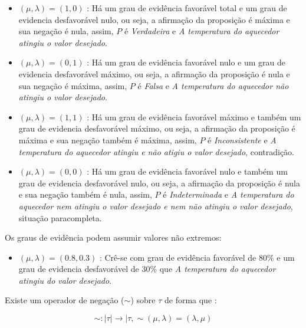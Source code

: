 \begin{itemize}
\item 
$(\mu, \lambda ) = (1,0)$ : Há um grau de evidência favorável total e um grau de evidencia desfavorável nulo, ou seja, a afirmação da proposição é máxima e sua negação é nula, assim,  $P$ é \emph{Verdadeira} e \emph{A temperatura do aquecedor atingiu o valor desejado}.

\item 
$(\mu, \lambda ) = (0,1)$ : Há um grau de evidência favorável nulo e um grau de evidencia desfavorável máximo, ou seja, a afirmação da proposição é nula e sua negação é máxima, assim,  $P$ é \emph{Falsa} e \emph{A temperatura do aquecedor não atingiu o valor desejado}.

\item 
$(\mu, \lambda ) = (1,1)$ : Há um grau de evidência favorável máximo e também um grau de evidencia desfavorável máximo, ou seja, a afirmação da proposição é máxima e sua negação também é máxima, assim,  $P$ é \emph{Inconsistente} e \emph{A temperatura do aquecedor atingiu e não atigiu o valor desejado}, contradição.

\item 
$(\mu, \lambda ) = (0,0)$ : Há um grau de evidência favorável nulo e também um grau de evidencia desfavorável nulo, ou seja, a afirmação da proposição é nula e sua negação também é nula, assim,  $P$ é \emph{Indeterminada} e \emph{A temperatura do aquecedor nem atingiu o valor desejado e nem não atingiu o valor desejado}, situação paracompleta.

\end{itemize}

Os graus de evidência podem assumir valores não extremos:

\begin{itemize}
\item 
$(\mu, \lambda ) = (0.8,0.3)$ : Crê-se com grau de evidência favorável de 80\% e um grau de evidencia desfavorável de 30\%  que \emph{A temperatura do aquecedor atingiu do valor desejado}.
\end{itemize}

Existe um operador de negação ($\sim $) sobre $\tau$ de forma que :
\begin{center}
\begin{equation}
\sim  : \mid \tau \mid \rightarrow \mid \tau , \sim(\mu, \lambda ) = (\lambda, \mu )
\end{equation}
\end{center}

